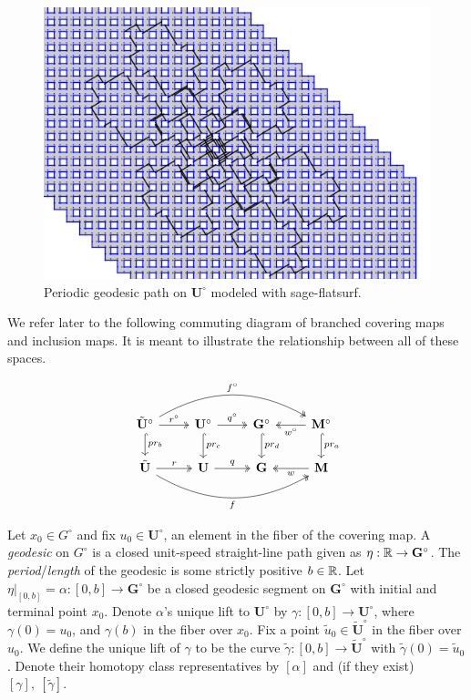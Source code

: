 \documentclass[]{article}
\def\bU{\mathbf{U}} \def\btU{\tilde{\bU}} \def\bUs{\bU^\circ}
\def\bG{\mathbf{G}} \def\bGs{\mathbf{G}^\circ}
\def\bM{\mathbf{M}}
\def\bMs{\mathbf{M}^\circ}
\def\btUs{\btU^\circ}
\def\utild{\tilde{u}_0}
\begin{document}
\begin{figure}[H]
\centering
\includegraphics[width=4in.]{closed2.png}
\caption{Periodic geodesic path on $\bUs$ modeled with sage-flatsurf.}
\label{fig:complicated}
\end{figure}

We refer later to the following commuting diagram of branched covering maps and inclusion maps. It is meant to illustrate the relationship between all of these spaces.

\begin{equation}
\begin{tikzcd}
\arrow[two heads, bend left]{rrr}{f^\circ}[swap]{} \arrow[hook]{d}{pr_b} \btUs \arrow[two heads]{r}{r^\circ} & \bUs \arrow[hook]{d}{pr_c} \arrow[two heads]{r}{q^\circ} & \bGs \arrow[hook]{d}{pr_d} &\arrow[two heads]{l}{w^\circ} \bMs \arrow[hook]{d}{pr_a}  \\
\arrow[two heads, bend right]{rrr}{}[swap]{f} \btU \arrow[two heads]{r}{r} & \bU \arrow[two heads]{r}{q} & \bG & \arrow[two heads]{l}{w}\bM  \\
\end{tikzcd}
\label{eq:commute}
\end{equation}



Let $x_0\in G^\circ$ and fix $u_0\in\bUs$, an element in the fiber of the covering map. A \emph{geodesic} on $G^\circ$ is a closed unit-speed straight-line path given as $\eta:\RR\rightarrow\bGs$. The \emph{period}/\emph{length} of the geodesic is some strictly positive $b\in\mathbb{R}$. Let $\eta|_{[0,b]}=\alpha:[0,b]\rightarrow\bGs$ be a closed geodesic segment on $\bGs$ with initial and terminal point $x_0$. Denote $\alpha$'s unique lift to $\bUs$ by $\gamma:[0,b]\rightarrow\bUs$, where $\gamma(0)=u_0$, and $\gamma(b)$ in the fiber over $x_0$. Fix a point $\utild\in\btUs$ in the fiber over $u_0$. We define the unique lift of $\gamma$ to be the curve $\tilde{\gamma}:[0,b]\rightarrow\btUs$ with $\tilde{\gamma}(0)=\utild$. Denote their homotopy class representatives by $[\alpha]$ and (if they exist) $[\gamma],~[\tilde{\gamma}]$.
\end{document}
